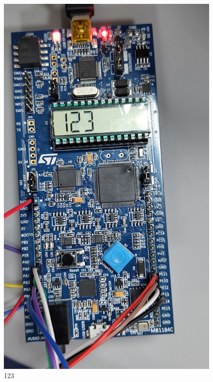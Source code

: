 \documentclass[12pt]{article}
\begin{document}
\begin{figure}[h!]
    \centering
    \begin{minipage}{0.45\textwidth}
        \centering
    \includegraphics[width=\textwidth]{123.jpg}
    \caption{123}
\end{minipage}
    \hfill
    \begin{minipage}{0.45\textwidth}
        \centering

\end{minipage}
\end{figure}
\end{document}
